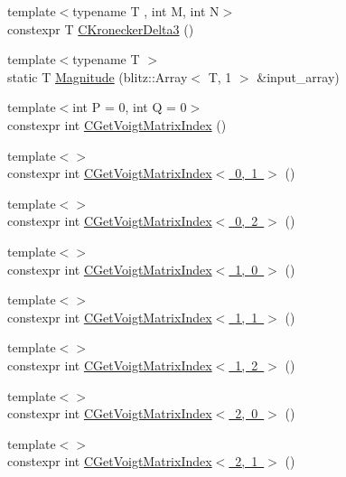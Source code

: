 \begin{DoxyCompactItemize}
{\footnotesize template$<$typename T , int M, int N$>$ }\\constexpr T \mbox{\hyperlink{namespacempc_1_1utilities_a15cbef577663b27df8b958056104d5d9}{C\+Kronecker\+Delta3}} ()
\item 
{\footnotesize template$<$typename T $>$ }\\static T \mbox{\hyperlink{namespacempc_1_1utilities_a387fd6b2510b25009905e8121755c207}{Magnitude}} (blitz\+::\+Array$<$ T, 1 $>$ \&input\+\_\+array)
\item 
{\footnotesize template$<$int P = 0, int Q = 0$>$ }\\constexpr int \mbox{\hyperlink{namespacempc_1_1utilities_ad2c3679a8e007d8b5a333490886ef19d}{C\+Get\+Voigt\+Matrix\+Index}} ()
\item 
{\footnotesize template$<$$>$ }\\constexpr int \mbox{\hyperlink{namespacempc_1_1utilities_a1163a24c2bd1283db7e8d0dc34bba058}{C\+Get\+Voigt\+Matrix\+Index$<$ 0, 1 $>$}} ()
\item 
{\footnotesize template$<$$>$ }\\constexpr int \mbox{\hyperlink{namespacempc_1_1utilities_a6d946e4fc6251c55592c3676a68621dd}{C\+Get\+Voigt\+Matrix\+Index$<$ 0, 2 $>$}} ()
\item 
{\footnotesize template$<$$>$ }\\constexpr int \mbox{\hyperlink{namespacempc_1_1utilities_abb39f4caf6929d77f9e58a54820e7dbb}{C\+Get\+Voigt\+Matrix\+Index$<$ 1, 0 $>$}} ()
\item 
{\footnotesize template$<$$>$ }\\constexpr int \mbox{\hyperlink{namespacempc_1_1utilities_ac1968a4d83d920187abe3b8ea87d1262}{C\+Get\+Voigt\+Matrix\+Index$<$ 1, 1 $>$}} ()
\item 
{\footnotesize template$<$$>$ }\\constexpr int \mbox{\hyperlink{namespacempc_1_1utilities_ac2da9934134d3a5867b925e1084bf1e4}{C\+Get\+Voigt\+Matrix\+Index$<$ 1, 2 $>$}} ()
\item 
{\footnotesize template$<$$>$ }\\constexpr int \mbox{\hyperlink{namespacempc_1_1utilities_a611ba0637a7bbdf72d869e716512afdb}{C\+Get\+Voigt\+Matrix\+Index$<$ 2, 0 $>$}} ()
\item 
{\footnotesize template$<$$>$ }\\constexpr int \mbox{\hyperlink{namespacempc_1_1utilities_a6c8cf9c62a6dbebe475b757cde3f50d7}{C\+Get\+Voigt\+Matrix\+Index$<$ 2, 1 $>$}} ()
\item 

\end{DoxyCompactItemize}
